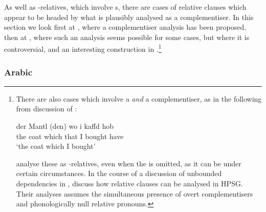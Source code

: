 \documentclass[output=paper
 	        ,biblatex
                ,babelshorthands
                ,newtxmath
                ,draftmode
                ,colorlinks, citecolor=brown
]{langscibook}
\begin{document}
As well as -relatives, which involve s, there are cases of relative clauses
which appear to be headed by what is plausibly analysed as a complementiser. In this
section we look first at , where a complementiser analysis has been proposed, 
then at , where such an analysis seems possible for some cases, but where it is
controversial, and an interesting construction in .\footnote{There are also cases which involve a  \emph{and} a
  complementiser, as in the following from  discussion of  :
  \begin{exe}
    \ex \gll der Mantl (den) wo i kaffd hob\\
    the coat \hphantom{(}which that I bought have\\
    \glt `the coat which I bought’
  \end{exe}
  \cite{Hinrichs:Nakazawa:02} analyse these as -relatives, even when the  is omitted,
  as it can be under certain circumstances. In the course of a discussion of unbounded
  dependencies in , \cite{Assmann:Heck:ea:10} discuss how  relative
  clauses can be analysed in HPSG. Their analyses assumes the simultaneous presence of overt
  complementisers and phonologically null relative pronouns.  }

\subsubsection{Arabic}
\label{sec:rc-arabic}
\end{document}

